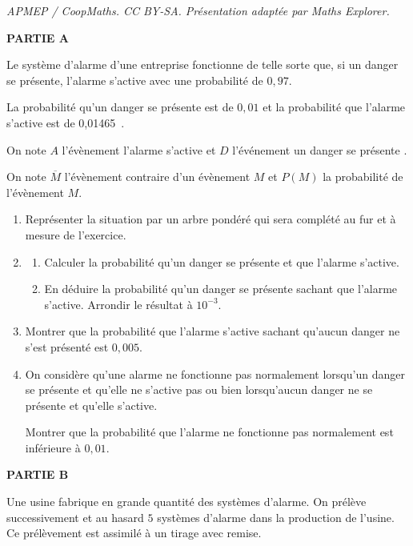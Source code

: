 \documentclass[10pt]{article}
\providecommand{\np}[2][]{{#2~#1}}
\begin{document}
\noindent\textit{APMEP / CoopMaths. CC BY-SA. Présentation adaptée par Maths Explorer.}\par\medskip
\medskip

\textbf{PARTIE A}

\medskip

Le système d'alarme d'une entreprise fonctionne de telle sorte que, si un danger se présente, l'alarme s'active avec une probabilité de $0,97$. 

La probabilité qu'un danger se présente est de $0,01$ et la probabilité que l'alarme s'active est de \np{0,01465}.

On note $A$ l'évènement \og  l'alarme s'active \fg{}  et $D$ l'événement \og  un danger se présente \fg . 

On note $\overline{M}$ l'évènement contraire d'un évènement $M$ et $P(M)$ la probabilité de l'évènement $M$.

\medskip

\begin{enumerate}
\item Représenter la situation par un arbre pondéré qui sera complété au fur et à mesure de l'exercice.
\item  
	\begin{enumerate}
		\item Calculer la probabilité qu'un danger se présente et que l'alarme s'active.
		\item En déduire la probabilité qu'un danger se présente sachant que l'alarme s'active.
Arrondir le résultat à $10^{-3}$.
	\end{enumerate}
\item  Montrer que la probabilité que l'alarme s'active sachant qu'aucun danger ne s'est présenté est $0,005$.
\item On considère qu'une alarme ne fonctionne pas normalement lorsqu'un danger se présente et qu'elle ne s'active pas ou bien lorsqu'aucun danger ne se présente et qu'elle s'active.

Montrer que la probabilité que l'alarme ne fonctionne pas normalement est inférieure à $0,01$.
\end{enumerate}

\medskip

\textbf{PARTIE B}

\medskip

Une usine fabrique en grande quantité des systèmes d'alarme. On prélève successivement et au hasard $5$ systèmes d'alarme dans la production de l'usine. Ce prélèvement est assimilé à un tirage avec remise.
\end{document}
